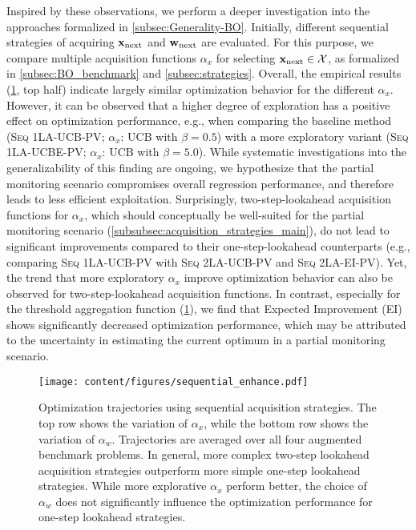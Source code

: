 Inspired by these observations, we perform a deeper investigation into the approaches formalized in \cref{subsec:Generality-BO}. 
Initially, different sequential strategies of acquiring ${\mathbf{x}}_{\text{next}}$ and ${\mathbf{w}}_{\text{next}}$ are evaluated. 
For this purpose, we compare multiple acquisition functions $\alpha_x$ for selecting ${\mathbf{x}}_{\text{next}} \in \mathcal{X}$, as formalized in \cref{subsec:BO_benchmark} and \cref{subsec:strategies}. 
Overall, the empirical results (\cref{fig:results_sequential}, top half) indicate largely similar optimization behavior for the different $\alpha_x$. 
However, it can be observed that a higher degree of exploration has a positive effect on optimization performance, e.g., when comparing the baseline method (\textsc{Seq 1LA-UCB-PV}; $\alpha_x$: UCB with $\beta = 0.5$) with a more exploratory variant (\textsc{Seq 1LA-UCBE-PV}; $\alpha_x$: UCB with $\beta = 5.0$). 
While systematic investigations into the generalizability of this finding are ongoing, we hypothesize that the partial monitoring scenario compromises overall regression performance, and therefore leads to less efficient exploitation.
Surprisingly, two-step-lookahead acquisition functions for $\alpha_x$, which should conceptually be well-suited for the partial monitoring scenario (\cref{subsubsec:acquisition_strategies_main}), do not lead to significant improvements compared to their one-step-lookahead counterparts (e.g., comparing \textsc{Seq 1LA-UCB-PV} with \textsc{Seq 2LA-UCB-PV} and \textsc{Seq 2LA-EI-PV}). Yet, the trend that more exploratory $\alpha_x$ improve optimization behavior can also be observed for two-step-lookahead acquisition functions. In contrast, especially for the threshold aggregation function (\cref{fig:results_sequential}), we find that Expected Improvement (EI) shows significantly decreased optimization performance, which may be attributed to the uncertainty in estimating the current optimum in a partial monitoring scenario. 

\begin{figure}[t]
    \centering
    \texttt{[image: content/figures/sequential\_enhance.pdf]}
    
    \vspace{-1em}
    
    \caption{Optimization trajectories using sequential acquisition strategies. The top row shows the variation of $\alpha_x$, while the bottom row shows the variation of $\alpha_w$. Trajectories are averaged over all four augmented benchmark problems. In general, more complex two-step lookahead acquisition strategies outperform more simple one-step lookahead strategies. While more explorative $\alpha_x$ perform better, the choice of $\alpha_w$ does not significantly influence the optimization performance for one-step lookahead strategies.
    }
    \label{fig:results_sequential}
\end{figure}

